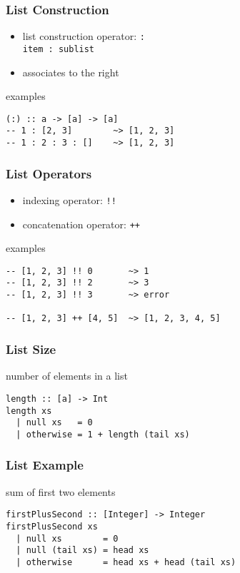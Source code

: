 \documentclass[dvipsnames]{beamer}
\theoremstyle{plain}
\begin{document}
\begin{frame}[fragile]
  \frametitle{List Construction}

  \begin{itemize}
    \item list construction operator: \lstinline|:|\\
      \lstinline|item : sublist|
    \item associates to the right
  \end{itemize}

  \pause
  \begin{exampleblock}{examples}
    \begin{lstlisting}
(:) :: a -> [a] -> [a]
-- 1 : [2, 3]        ~> [1, 2, 3]
-- 1 : 2 : 3 : []    ~> [1, 2, 3]
    \end{lstlisting}
  \end{exampleblock}
\end{frame}

\begin{frame}[fragile]
  \frametitle{List Operators}

  \begin{itemize}
    \item indexing operator: \lstinline|!!|
    \item concatenation operator: \lstinline|++|
  \end{itemize}

  \pause
  \begin{exampleblock}{examples}
    \begin{lstlisting}
-- [1, 2, 3] !! 0       ~> 1
-- [1, 2, 3] !! 2       ~> 3
-- [1, 2, 3] !! 3       ~> error

-- [1, 2, 3] ++ [4, 5]  ~> [1, 2, 3, 4, 5]
    \end{lstlisting}
  \end{exampleblock}
\end{frame}

\begin{frame}[fragile]
  \frametitle{List Size}

  \begin{exampleblock}{number of elements in a list}
    \begin{lstlisting}[deletekeywords={length}]
length :: [a] -> Int
length xs
  | null xs   = 0
  | otherwise = 1 + length (tail xs)
    \end{lstlisting}
  \end{exampleblock}
\end{frame}

\begin{frame}[fragile]
  \frametitle{List Example}

  \begin{exampleblock}{sum of first two elements}
    \begin{lstlisting}
firstPlusSecond :: [Integer] -> Integer
firstPlusSecond xs
  | null xs        = 0
  | null (tail xs) = head xs
  | otherwise      = head xs + head (tail xs)
    \end{lstlisting}
  \end{exampleblock}
\end{frame}
\end{document}
